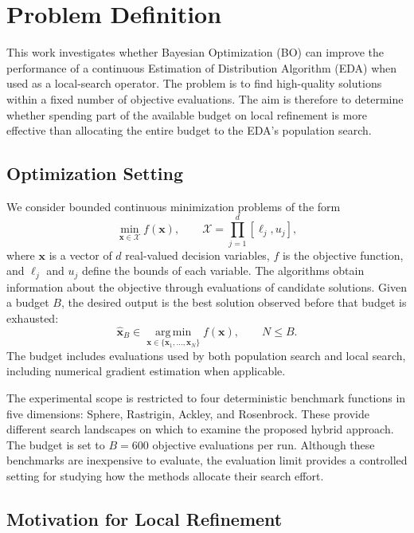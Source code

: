 \section{Problem Definition}

This work investigates whether Bayesian Optimization (BO) can improve the
performance of a continuous Estimation of Distribution Algorithm (EDA) when
used as a local-search operator. The problem is to find high-quality solutions
within a fixed number of objective evaluations. The aim is therefore to
determine whether spending part of the available budget on local refinement
is more effective than allocating the entire budget to the EDA's population
search.

\subsection{Optimization Setting}

We consider bounded continuous minimization problems of the form
\begin{equation}
    \min_{\mathbf{x} \in \mathcal{X}} f(\mathbf{x}),
    \qquad
    \mathcal{X} = \prod_{j=1}^{d} [\ell_j,u_j],
\end{equation}
where $\mathbf{x}$ is a vector of $d$ real-valued decision variables,
$f$ is the objective function, and $\ell_j$ and $u_j$ define the bounds of
each variable. The algorithms obtain information about the objective through
evaluations of candidate solutions. Given a budget $B$, the desired output
is the best solution observed before that budget is exhausted:
\begin{equation}
    \hat{\mathbf{x}}_B \in
    \operatorname*{arg\,min}_{\mathbf{x} \in \{\mathbf{x}_1,\ldots,
    \mathbf{x}_{N}\}} f(\mathbf{x}), \qquad N \leq B.
\end{equation}
The budget includes evaluations used by both population search and local
search, including numerical gradient estimation when applicable.

The experimental scope is restricted to four deterministic benchmark
functions in five dimensions: Sphere, Rastrigin, Ackley, and Rosenbrock.
These provide different search landscapes on which to examine the proposed
hybrid approach. The budget is set to $B=600$ objective evaluations per
run. Although these benchmarks are inexpensive to evaluate, the evaluation
limit provides a controlled setting for studying how the methods allocate
their search effort.

\subsection{Motivation for Local Refinement}

